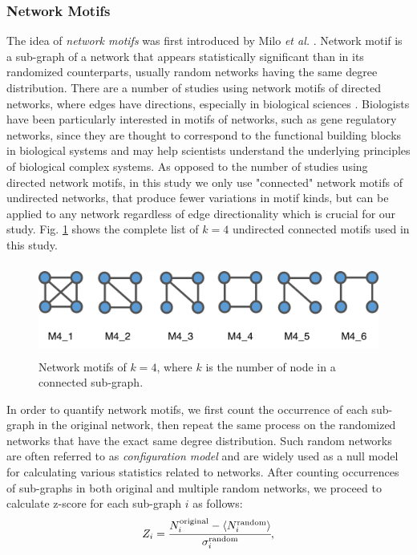 \documentclass{article}
\begin{document}
	\subsubsection{Network Motifs} 
The idea of \textit{network motifs} was first introduced by Milo \textit{et al.} \cite{Milo_motif}. Network motif is a sub-graph of a network that appears statistically significant than in its randomized counterparts, usually random networks having the same degree distribution. There are a number of studies using network motifs of directed networks, where edges have directions, especially in biological sciences \cite{Alon2007, MotifsInBrain, NetworkMotifsEcoli}. Biologists have been particularly interested in motifs of networks, such as gene regulatory networks, since they are thought to correspond to the functional building blocks in biological systems and may help scientists understand the underlying principles of biological complex systems.
As opposed to the number of studies using directed network motifs, in this study we only use "connected" network motifs of undirected networks, that produce fewer variations in motif kinds, but can be applied to any network regardless of edge directionality which is crucial for our study. Fig. \ref{motifs} shows the complete list of $k=4$ undirected connected motifs used in this study.

\begin{figure}[ht]
	\begin{center}
		\vspace{0.5cm}
		\includegraphics[clip,width=12cm,height = 3cm]{figs/motifs.png}
		\vspace{0.5cm}
		\caption{Network motifs of $k =4$, where $k$ is the number of node in a connected sub-graph.}
		\label{motifs}
	\end{center}
\end{figure}

In order to quantify network motifs, we first count the occurrence of each sub-graph in the original network, then repeat the same process on the randomized networks that have the exact same degree distribution. Such random networks are often referred to as \textit{configuration model} and are widely used as a null model for calculating various statistics related to networks. After counting occurrences of sub-graphs in both original and multiple random networks, we proceed to calculate z-score for each sub-graph $i$ as follows:
	\begin{equation}
	Z_i = \cfrac{N_i^{\text{original}} - \langle N_i^{\text{random}} \rangle }{\sigma_i^{\text{random}}},
	\end{equation}
\end{document}
